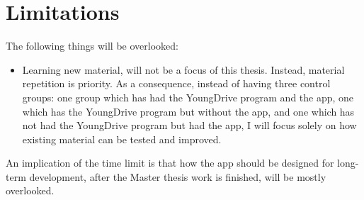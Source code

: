 \section{Limitations}

The following things will be overlooked:
\begin{itemize}
\item Learning new material, will not be a focus of this thesis. Instead, material repetition is priority. As a consequence, instead of having three control groups: one group which has had the YoungDrive program and the app, one which has the YoungDrive program but without the app, and one which has not had the YoungDrive program but had the app, I will focus solely on how existing material  can be tested and improved.
\end{itemize}

An implication of the time limit is that how the app should be designed for long-term development, after the Master thesis work is finished, will be mostly overlooked.